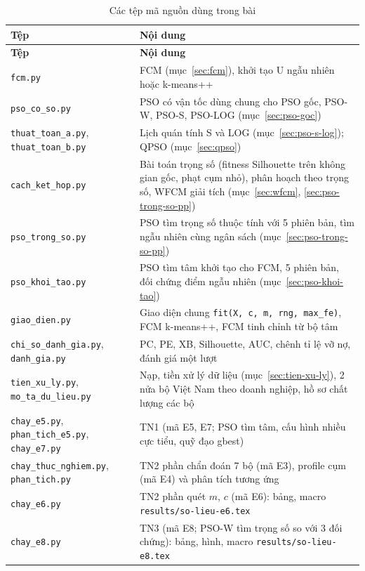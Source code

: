 {\footnotesize
\begin{longtable}{@{}>{\raggedright\arraybackslash}p{4.4cm}>{\raggedright\arraybackslash}p{10.4cm}@{}}
\caption{Các tệp mã nguồn dùng trong bài}\label{tab:pl-ma-nguon}\\
\toprule
\textbf{Tệp} & \textbf{Nội dung} \\
\midrule
\endfirsthead
\toprule
\textbf{Tệp} & \textbf{Nội dung} \\
\midrule
\endhead
\texttt{fcm.py} & FCM (mục~\ref{sec:fcm}), khởi tạo U ngẫu nhiên hoặc k-means++ \\
\texttt{pso\_co\_so.py} & PSO có vận tốc dùng chung cho PSO gốc, PSO-W, PSO-S, PSO-LOG (mục~\ref{sec:pso-goc}) \\
\texttt{thuat\_toan\_a.py}, \texttt{thuat\_toan\_b.py} & Lịch quán tính S và LOG (mục~\ref{sec:pso-s-log}); QPSO (mục~\ref{sec:qpso}) \\
\texttt{cach\_ket\_hop.py} & Bài toán trọng số (fitness Silhouette trên không gian gốc, phạt cụm nhỏ), phân hoạch theo trọng số, WFCM giải tích (mục~\ref{sec:wfcm}, \ref{sec:pso-trong-so-pp}) \\
\texttt{pso\_trong\_so.py} & PSO tìm trọng số thuộc tính với 5 phiên bản, tìm ngẫu nhiên cùng ngân sách (mục~\ref{sec:pso-trong-so-pp}) \\
\texttt{pso\_khoi\_tao.py} & PSO tìm tâm khởi tạo cho FCM, 5 phiên bản, đối chứng điểm ngẫu nhiên (mục~\ref{sec:pso-khoi-tao}) \\
\texttt{giao\_dien.py} & Giao diện chung \texttt{fit(X, c, m, rng, max\_fe)}, FCM k-means++, FCM tinh chỉnh từ bộ tâm \\
\texttt{chi\_so\_danh\_gia.py}, \texttt{danh\_gia.py} & PC, PE, XB, Silhouette, AUC, chênh tỉ lệ vỡ nợ, đánh giá một lượt \\
\texttt{tien\_xu\_ly.py}, \texttt{mo\_ta\_du\_lieu.py} & Nạp, tiền xử lý dữ liệu (mục~\ref{sec:tien-xu-ly}), 2 nửa bộ Việt Nam theo doanh nghiệp, hồ sơ chất lượng các bộ \\
\texttt{chay\_e5.py}, \texttt{phan\_tich\_e5.py}, \texttt{chay\_e7.py} & TN1 (mã E5, E7; PSO tìm tâm, cấu hình nhiều cực tiểu, quỹ đạo gbest) \\
\texttt{chay\_thuc\_nghiem.py}, \texttt{phan\_tich.py} & TN2 phần chẩn đoán 7 bộ (mã E3), profile cụm (mã E4) và phân tích tương ứng \\
\texttt{chay\_e6.py} & TN2 phần quét $m$, $c$ (mã E6): bảng, macro \texttt{results/so-lieu-e6.tex} \\
\texttt{chay\_e8.py} & TN3 (mã E8; PSO-W tìm trọng số so với 3 đối chứng): bảng, hình, macro \texttt{results/so-lieu-e8.tex} \\

\end{longtable}}
